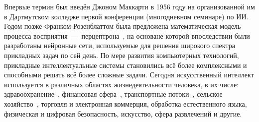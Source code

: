 
Впервые термин был введён Джоном Маккарти в 1956 году на организованной им в Дартмутском колледже первой конференции (многодневном семинаре) по ИИ. Годом позже Франком Розенблаттом была предложена математическая модель процесса восприятия~---~перцептрона~\cite{rosenblatt}, на основане которой впоследствии были разработаны нейронные сети, используемые для решения широкого спектра прикладных задач по сей день. По мере развития компьютерных технологий, прикладные интеллектуальные системы становились всё более комплексными и способными решать всё более сложные задачи. Сегодня искусственный интеллект используется в различных областях жизнедеятельности человека, в их числе: здравоохранение~\cite{glicksberg, awasthi, kitsios}, финансовая сфера~\cite{bahoo, weber, ghiath}, транспортные потоки~\cite{sayed, jiang, mushtaq}, сельское хозяйство~\cite{oliveira, bhagat, padhiary}, торговля и электронная коммерция, обработка естественного языка, физическая и цифровая безопасность, искусство, сфера развлечений и другие.






